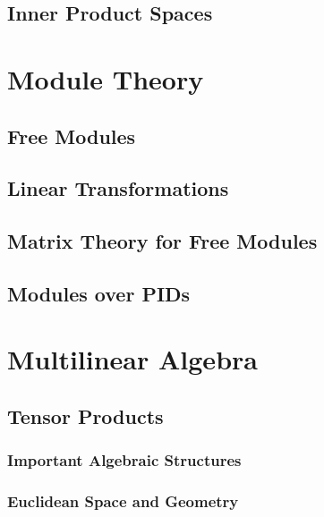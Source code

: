 \documentclass[12pt, a4paper, oneside, openright, titlepage]{book}
\begin{document}
\chapter{Inner Product Spaces}


\part{Module Theory}

\chapter{Free Modules}



\chapter{Linear Transformations}


\chapter{Matrix Theory for Free Modules}



\chapter{Modules over PIDs}



\part{Multilinear Algebra}


\chapter{Tensor Products}


\begin{appendices}
    \section{Important Algebraic Structures}
    
    
    \section{Euclidean Space and Geometry}
\end{appendices}
\end{document}

